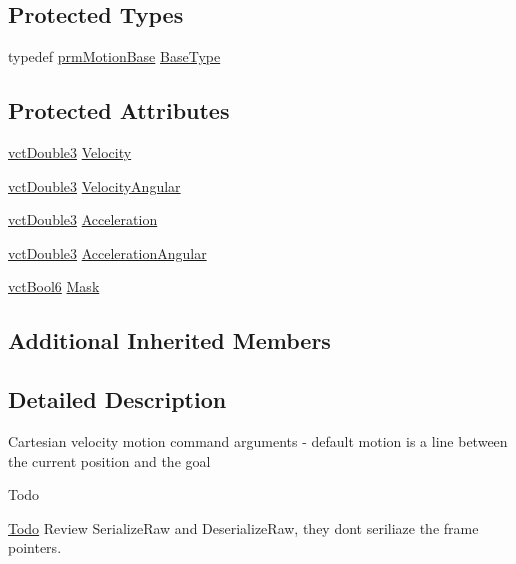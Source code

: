 \subsection*{Protected Types}
\begin{DoxyCompactItemize}
\item 
typedef \hyperlink{classprm_motion_base}{prm\+Motion\+Base} \hyperlink{classprm_velocity_cartesian_set_ade8ba9bb6ac994b5e7fd11084d3f54f1}{Base\+Type}
\end{DoxyCompactItemize}
\subsection*{Protected Attributes}
\begin{DoxyCompactItemize}
\item 
\hyperlink{vct_fixed_size_vector_types_8h_a4a89122c9d7f72c3f31fe8126e17c3af}{vct\+Double3} \hyperlink{classprm_velocity_cartesian_set_a8cc967fe13fe3167899f35394ef46dd0}{Velocity}
\item 
\hyperlink{vct_fixed_size_vector_types_8h_a4a89122c9d7f72c3f31fe8126e17c3af}{vct\+Double3} \hyperlink{classprm_velocity_cartesian_set_a9d72325c32e55acfe48be69131f34fc3}{Velocity\+Angular}
\item 
\hyperlink{vct_fixed_size_vector_types_8h_a4a89122c9d7f72c3f31fe8126e17c3af}{vct\+Double3} \hyperlink{classprm_velocity_cartesian_set_a06731c23de2a0df1e3bcb7c4a06e988f}{Acceleration}
\item 
\hyperlink{vct_fixed_size_vector_types_8h_a4a89122c9d7f72c3f31fe8126e17c3af}{vct\+Double3} \hyperlink{classprm_velocity_cartesian_set_a8a5727216f0caf109547c0cfd3ae6e43}{Acceleration\+Angular}
\item 
\hyperlink{vct_fixed_size_vector_types_8h_a1494a41869ce763813f2bf7f922b8fdd}{vct\+Bool6} \hyperlink{classprm_velocity_cartesian_set_aac00bb3d01fc051ac28f1ae32e06cfab}{Mask}
\end{DoxyCompactItemize}
\subsection*{Additional Inherited Members}


\subsection{Detailed Description}
Cartesian velocity motion command arguments -\/ default motion is a line between the current position and the goal\begin{DoxyRefDesc}{Todo}
\item[\hyperlink{todo__todo000011}{Todo}]Review Serialize\+Raw and Deserialize\+Raw, they don\textquotesingle{}t seriliaze the frame pointers. \end{DoxyRefDesc}


